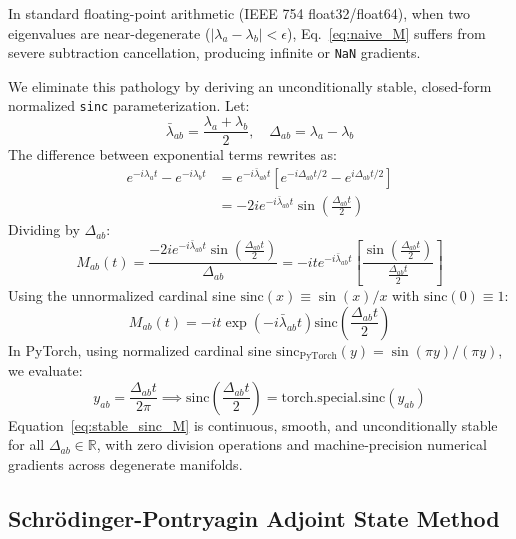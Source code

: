 \documentclass[10pt,twocolumn,3p]{article}
\begin{document}
In standard floating-point arithmetic (IEEE 754 float32/float64), when two eigenvalues are near-degenerate ($|\lambda_a - \lambda_b| < \epsilon$), Eq.~\eqref{eq:naive_M} suffers from severe subtraction cancellation, producing infinite or \texttt{NaN} gradients.

We eliminate this pathology by deriving an unconditionally stable, closed-form normalized \texttt{sinc} parameterization. Let:
\begin{equation}
    \bar{\lambda}_{ab} = \frac{\lambda_a + \lambda_b}{2}, \quad \Delta_{ab} = \lambda_a - \lambda_b
\end{equation}
The difference between exponential terms rewrites as:
\begin{align}
    e^{-i \lambda_a t} - e^{-i \lambda_b t} &= e^{-i \bar{\lambda}_{ab} t} \left[ e^{-i \Delta_{ab} t / 2} - e^{i \Delta_{ab} t / 2} \right] \nonumber \\
    &= -2i e^{-i \bar{\lambda}_{ab} t} \sin\left(\frac{\Delta_{ab} t}{2}\right)
\end{align}
Dividing by $\Delta_{ab}$:
\begin{equation}
    M_{ab}(t) = \frac{-2i e^{-i \bar{\lambda}_{ab} t} \sin\left(\frac{\Delta_{ab} t}{2}\right)}{\Delta_{ab}} = -i t e^{-i \bar{\lambda}_{ab} t} \left[ \frac{\sin\left(\frac{\Delta_{ab} t}{2}\right)}{\frac{\Delta_{ab} t}{2}} \right]
\end{equation}
Using the unnormalized cardinal sine $\text{sinc}(x) \equiv \sin(x)/x$ with $\text{sinc}(0) \equiv 1$:
\begin{equation}
    \boxed{M_{ab}(t) = -i t \exp\left( -i \bar{\lambda}_{ab} t \right) \text{sinc}\left( \frac{\Delta_{ab} t}{2} \right)}
    \label{eq:stable_sinc_M}
\end{equation}
In PyTorch, using normalized cardinal sine $\text{sinc}_{\text{PyTorch}}(y) = \sin(\pi y)/(\pi y)$, we evaluate:
\begin{equation}
    y_{ab} = \frac{\Delta_{ab} t}{2\pi} \implies \text{sinc}\left(\frac{\Delta_{ab} t}{2}\right) = \text{torch.special.sinc}(y_{ab})
\end{equation}
Equation~\eqref{eq:stable_sinc_M} is continuous, smooth, and unconditionally stable for all $\Delta_{ab} \in \mathbb{R}$, with zero division operations and machine-precision numerical gradients across degenerate manifolds.

\subsection{Schr\"odinger-Pontryagin Adjoint State Method}
\label{subsec:adjoint}
\end{document}
